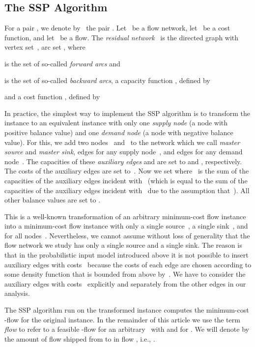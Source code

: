 \documentclass[11pt]{article}
\begin{document}
 
\subsection{The SSP Algorithm}
\label{sec:SSPAlg}

For a pair , we denote by~ the pair . Let~ be a flow network, let~ be a cost function, and let~ be a flow. The \emph{residual network}~ is the directed graph with vertex set~, arc set , where

is the set of so-called \emph{forward arcs} and

is the set of so-called \emph{backward arcs}, a capacity function , defined by

and a cost function , defined by

In practice, the simplest way to implement the SSP algorithm is to transform the instance to an equivalent instance with only one \emph{supply node} (a node with positive balance value) and one \emph{demand node} (a node with negative balance value). For this, we add two nodes~ and~ to the network which we call \emph{master source} and \emph{master sink}, edges  for any supply node~, and edges  for any demand node~. The capacities of these \emph{auxiliary edges}  and  are set to  and , respectively. The costs of the auxiliary edges are set to~. Now we set  where~ is the sum of the capacities of the auxiliary edges incident with~ (which is equal to the sum of the capacities of the auxiliary edges incident with~ due to the assumption that~). All other balance values are set to .

This is a well-known transformation of an arbitrary minimum-cost flow instance into a minimum-cost flow instance with only a single source~, a single sink~, and~ for all nodes~. Nevertheless, we cannot assume without loss of generality that the flow network we study has only a single source and a single sink. The reason is that in the probabilistic input model introduced above it is not possible to insert auxiliary edges with costs~ because the costs of each edge are chosen according to some density function that is bounded from above by~. We have to consider the auxiliary edges with costs~ explicitly and separately from the other edges in our analysis.

The SSP algorithm run on the transformed instance computes the minimum-cost -flow for the original instance.
In the remainder of this article we use the term \emph{flow} to refer to a feasible -flow for an arbitrary~ with  and  for .
We will denote by  the amount of flow shipped from  to  in flow ,
i.e.,
.
\end{document}
